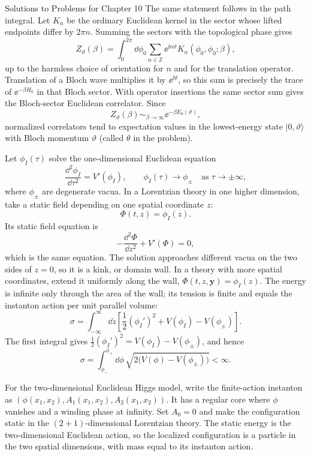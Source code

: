 \begin{bankssolutions}{Solutions to Problems for Chapter 10}
The same statement follows in the path integral.  Let $K_n$ be the ordinary
Euclidean kernel in the sector whose lifted endpoints differ by $2\pi n$.
Summing the sectors with the topological phase gives
\[
 Z_\vartheta(\beta)=\int_0^{2\pi}\dd\phi_0
 \sum_{n\in\mathbb Z}\ee^{\ii n\vartheta}K_n(\phi_0,\phi_0;\beta),
\]
up to the harmless choice of orientation for $n$ and for the translation
operator.  Translation of a Bloch wave multiplies it by
$\ee^{\ii\vartheta}$, so this sum is precisely the trace of
$\ee^{-\beta H_0}$ in that Bloch sector.  With operator insertions the same
sector sum gives the Bloch-sector Euclidean correlator.  Since
\[
 Z_\vartheta(\beta)\mathop{\sim}_{\beta\to\infty}
 \ee^{-\beta E_0(\vartheta)},
\]
normalized correlators tend to expectation values in the lowest-energy state
$|0,\vartheta\rangle$ with Bloch momentum $\vartheta$ (called $\theta$ in
the problem).

Let $\phi_I(\tau)$ solve the one-dimensional Euclidean equation
\[
 \frac{\dd^2\phi_I}{\dd\tau^2}=V'(\phi_I),
 \qquad
 \phi_I(\tau)\longrightarrow\phi_\pm
 \quad\text{as }\tau\longrightarrow\pm\infty,
\]
where $\phi_\pm$ are degenerate vacua.  In a Lorentzian theory in one higher
dimension, take a static field depending on one spatial coordinate $z$:
\[
 \Phi(t,z)=\phi_I(z).
\]
Its static field equation is
\[
 -\frac{\dd^2\Phi}{\dd z^2}+V'(\Phi)=0,
\]
which is the same equation.  The solution approaches different vacua on the
two sides of $z=0$, so it is a kink, or domain wall.  In a theory with more
spatial coordinates, extend it uniformly along the wall,
$\Phi(t,z,\mathbf y)=\phi_I(z)$.  The energy is infinite only through the
area of the wall; its tension is finite and equals the instanton action per
unit parallel volume:
\[
 \sigma=\int_{-\infty}^{\infty}\dd z
 \left[\frac12(\phi_I')^2+V(\phi_I)-V(\phi_\pm)\right].
\]
The first integral gives
$\frac12(\phi_I')^2=V(\phi_I)-V(\phi_\pm)$, and hence
\[
 \sigma=\int_{\phi_-}^{\phi_+}\dd\phi\,
 \sqrt{2\bigl(V(\phi)-V(\phi_\pm)\bigr)}<\infty.
\]

For the two-dimensional Euclidean Higgs model, write the finite-action
instanton as $(\phi(x_1,x_2),A_1(x_1,x_2),A_2(x_1,x_2))$.  It has a regular core
where $\phi$ vanishes and a winding phase at infinity.  Set $A_0=0$ and make
the configuration static in the $(2+1)$-dimensional Lorentzian theory.  The
static energy is the two-dimensional Euclidean action, so the localized
configuration is a particle in the two spatial dimensions, with mass equal to
its instanton action.


\end{bankssolutions}
